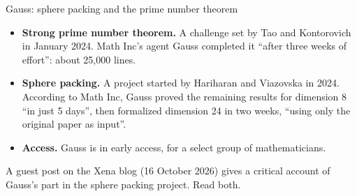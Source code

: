 \documentclass[10pt, aspectratio=169]{beamer}
\begin{document}
\begin{frame}[fragile]{Gauss: sphere packing and the prime number theorem}
\begin{itemize}
\item \textbf{Strong prime number theorem.} A challenge set by Tao and Kontorovich in January 2024. Math Inc's agent Gauss completed it ``after three weeks of effort'': about 25,000 lines.
\item \textbf{Sphere packing.} A project started by Hariharan and Viazovska in 2024. According to Math Inc, Gauss proved the remaining results for dimension 8 ``in just 5 days'', then formalized dimension 24 in two weeks, ``using only the original paper as input''.
\item \textbf{Access.} Gauss is in early access, for a select group of mathematicians.
\end{itemize}

\vspace{0.4em}
\begin{caveat}
A guest post on the Xena blog (16 October 2026) gives a critical account of Gauss's part in the sphere packing project. Read both.
\end{caveat}

\end{frame}
\end{document}
